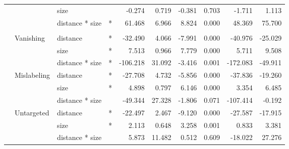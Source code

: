 \begin{longtable}[t]{llllrrrrrr}
\cmidrule{3-10}\nopagebreak
\hspace{1em} &  & size &  & -0.274 & 0.719 & -0.381 & 0.703 & -1.711 & 1.113\\
\cmidrule{3-10}\nopagebreak
\hspace{1em} &  & distance * size & * & 61.468 & 6.966 & 8.824 & 0.000 & 48.369 & 75.700\\
\cmidrule{1-10}\pagebreak[0]
\addlinespace[0.3em]
\multicolumn{10}{l}{\textbf{Cascade R-CNN}}\\
\hspace{1em} & Vanishing & distance & * & -32.490 & 4.066 & -7.991 & 0.000 & -40.976 & -25.029\\
\cmidrule{3-10}\nopagebreak
\hspace{1em} &  & size & * & 7.513 & 0.966 & 7.779 & 0.000 & 5.711 & 9.508\\
\cmidrule{3-10}\nopagebreak
\hspace{1em} &  & distance * size & * & -106.218 & 31.092 & -3.416 & 0.001 & -172.083 & -49.911\\
\cmidrule{2-10}\nopagebreak
\hspace{1em} & Mislabeling & distance & * & -27.708 & 4.732 & -5.856 & 0.000 & -37.836 & -19.260\\
\cmidrule{3-10}\nopagebreak
\hspace{1em} &  & size & * & 4.898 & 0.797 & 6.146 & 0.000 & 3.354 & 6.485\\
\cmidrule{3-10}\nopagebreak
\hspace{1em} &  & distance * size &  & -49.344 & 27.328 & -1.806 & 0.071 & -107.414 & -0.192\\
\cmidrule{2-10}\nopagebreak
\hspace{1em} & Untargeted & distance & * & -22.497 & 2.467 & -9.120 & 0.000 & -27.587 & -17.915\\
\cmidrule{3-10}\nopagebreak
\hspace{1em} &  & size & * & 2.113 & 0.648 & 3.258 & 0.001 & 0.833 & 3.381\\
\cmidrule{3-10}\nopagebreak
\hspace{1em} &  & distance * size &  & 5.873 & 11.482 & 0.512 & 0.609 & -18.022 & 27.276\\
\bottomrule
\end{longtable}
\endgroup{}

